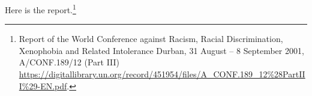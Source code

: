 \documentclass{scrbook}
\begin{document}
Here is the report.\footnote{Report of the World Conference against Racism, Racial Discrimination, Xenophobia and Related Intolerance Durban, 31 August -- 8 September 2001, A/CONF.189/12 (Part III) \url{https://digitallibrary.un.org/record/451954/files/A_CONF.189_12\%28PartIII\%29-EN.pdf}.}
\end{document}
